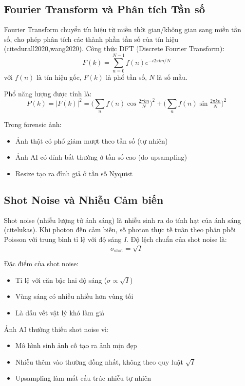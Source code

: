 \documentclass[14pt,a4paper,oneside]{report}
\begin{document}
\subsection{Fourier Transform và Phân tích Tần số}
Fourier Transform chuyển tín hiệu từ miền thời gian/không gian sang miền tần số, cho phép phân tích các thành phần tần số của tín hiệu \\(cite{durall2020,wang2020}). Công thức DFT (Discrete Fourier Transform):
\[
F(k)=\sum_{n=0}^{N-1}f(n)e^{-i2\pi kn/N}
\]
với $f(n)$ là tín hiệu gốc, $F(k)$ là phổ tần số, $N$ là số mẫu.

Phổ năng lượng được tính là:
\[
P(k)=|F(k)|^2=\Big(\sum_{n} f(n)\cos\tfrac{2\pi kn}{N}\Big)^2+\Big(\sum_{n} f(n)\sin\tfrac{2\pi kn}{N}\Big)^2
\]

Trong forensic ảnh:
\begin{itemize}
  \item Ảnh thật có phổ giảm mượt theo tần số (tự nhiên)
  \item Ảnh AI có đỉnh bất thường ở tần số cao (do upsampling)
  \item Resize tạo ra đỉnh giả ở tần số Nyquist
\end{itemize}

\subsection{Shot Noise và Nhiễu Cảm biến}
Shot noise (nhiễu lượng tử ánh sáng) là nhiễu sinh ra do tính hạt của ánh sáng \\(cite{lukas}). Khi photon đến cảm biến, số photon thực tế tuân theo phân phối Poisson với trung bình tỉ lệ với độ sáng $I$. Độ lệch chuẩn của shot noise là:
\[
\sigma_{\text{shot}}=\sqrt{I}
\]

Đặc điểm của shot noise:
\begin{itemize}
  \item Tỉ lệ với căn bậc hai độ sáng ($\sigma\propto\sqrt{I}$)
  \item Vùng sáng có nhiễu nhiều hơn vùng tối
  \item Là dấu vết vật lý khó làm giả
\end{itemize}

Ảnh AI thường thiếu shot noise vì:
\begin{itemize}
  \item Mô hình sinh ảnh cố tạo ra ảnh mịn đẹp
  \item Nhiễu thêm vào thường đồng nhất, không theo quy luật $\sqrt{I}$
  \item Upsampling làm mất cấu trúc nhiễu tự nhiên
\end{itemize}
\end{document}
